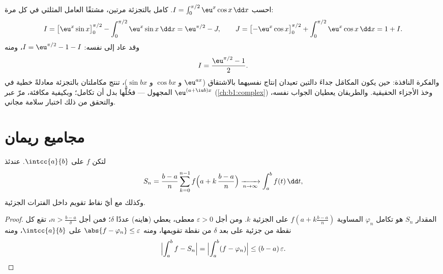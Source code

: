 \begin{example}\label{ex:b1:integration:boomerang}
احسب $I = \int_0^{\pi/2} \eu^x \cos x\,\dd x$. كامل
بالتجزئة مرتين، مشتقًا العامل المثلثي في كل مرة:
\[
I = \bigl[\eu^x \sin x\bigr]_0^{\pi/2}
- \int_0^{\pi/2} \eu^x \sin x\,\dd x
= \eu^{\pi/2} - J,
\qquad
J = \bigl[-\eu^x\cos x\bigr]_0^{\pi/2}
+ \int_0^{\pi/2} \eu^x\cos x\,\dd x = 1 + I .
\]
وقد عاد  إلى نفسه: $I = \eu^{\pi/2} - 1 - I$،
ومنه
\[
I = \frac{\eu^{\pi/2} - 1}{2} .
\]
والفكرة النافذة: حين يكون المكامَل جداءَ دالتين
تعيدان إنتاج نفسيهما بالاشتقاق
($\eu^{ax}$ و $\cos bx$ و $\sin bx$)، تنتج مكاملتان بالتجزئة
معادلةً خطية في  المجهول --- فحُلَّها
بدل أن تكامل؛ وبكيفية مكافئة، مرّ عبر
$\eu^{(a + \iu b)x}$ (\cref{ch:b1:complex}) وخذ الأجزاء
الحقيقية. والطريقان يعطيان الجواب نفسه، والتحقق من ذلك
اختبار سلامة مجاني.
\end{example}

\section{مجاميع ريمان}

\begin{theorem}\label{thm:b1:integration:riemann}
لتكن $f$  على $\intcc{a}{b}$. عندئذ
\[
S_n = \frac{b - a}{n} \sum_{k=0}^{n-1}
f\Bigl(a + k\,\frac{b-a}{n}\Bigr)
\xrightarrow[n \to \infty]{} \int_a^b f(t)\, \dd t ,
\]
وكذلك مع أيّ نقاط تقويم داخل الفترات الجزئية.
\end{theorem}

\begin{proof}
المقدار $S_n$ هو تكامل  $\varphi_n$ المساوية
$f(a + k\frac{b-a}{n})$ على  الجزئية $k$. ومن أجل
$\varepsilon > 0$ معطى، يعطي  (هاينه) عددًا $\delta$؛ فمن أجل
$n > \frac{b-a}{\delta}$، تقع كل نقطة من  جزئية على بعد
$\delta$ من نقطة تقويمها، ومنه $\abs{f - \varphi_n} \leq
\varepsilon$ على $\intcc{a}{b}$، ومنه
\[
\Bigl| \int_a^b f - S_n \Bigr|
= \Bigl| \int_a^b (f - \varphi_n) \Bigr|
\leq (b-a)\,\varepsilon . \qedhere
\]
\end{proof}

